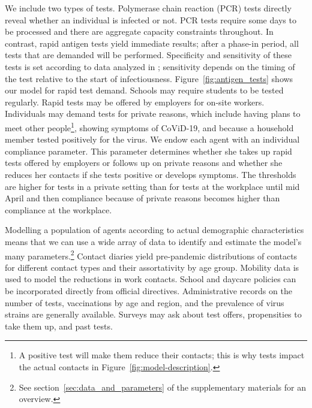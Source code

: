 We include two types of tests. Polymerase chain reaction (PCR) tests
directly reveal whether an
individual is infected or not. PCR tests require some days to be processed and there are
aggregate capacity constraints throughout. In contrast, rapid antigen tests yield
immediate results; after a phase-in period, all tests that are demanded will be
performed. Specificity and sensitivity of these tests is set according to data analyzed
in \cite{Bruemmer2021, Smith2021}; sensitivity depends on the timing of the test relative
to the start of infectiousness. Figure~\ref{fig:antigen_tests} shows our model for rapid
test demand. Schools may require students to be tested regularly. Rapid tests may be
offered by employers for on-site workers. Individuals may demand tests for private
reasons, which include having plans to meet other people\footnote{A positive test will
make them reduce their contacts; this is why tests impact the actual contacts in
Figure~\ref{fig:model-description}.}, showing symptoms of CoViD-19, and because a
household member tested positively for the virus. We endow each agent with an individual
compliance parameter. This parameter determines whether she takes up rapid tests offered
by employers or follows up on private reasons and whether she reduces her contacts if she
tests positive or develops symptoms. The thresholds are higher for tests in a private
setting than for tests at the workplace until mid April and then compliance because of
private reasons becomes higher than compliance at the workplace.

Modelling a population of agents according to actual demographic characteristics means
that we can use a wide array of data to identify and estimate the model's many
parameters.\footnote{See section~\ref{sec:data_and_parameters} of the supplementary
materials for an overview.} Contact diaries yield pre-pandemic distributions of contacts
for different contact types and their assortativity by age group. Mobility data is used
to model the reductions in work contacts. School and daycare policies can be incorporated
directly from official directives. Administrative records on the number of tests,
vaccinations by age and region, and the prevalence of virus strains are generally
available. Surveys may ask about test offers, propensities to take them up, and past
tests.

